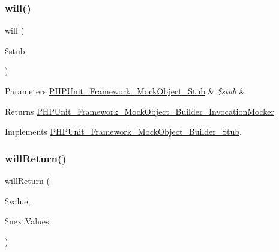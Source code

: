 \subsubsection{\texorpdfstring{will()}{will()}}
{\footnotesize\ttfamily will (\begin{DoxyParamCaption}\item[{\mbox{\hyperlink{interface_p_h_p_unit___framework___mock_object___stub}{P\+H\+P\+Unit\+\_\+\+Framework\+\_\+\+Mock\+Object\+\_\+\+Stub}}}]{\$stub }\end{DoxyParamCaption})}


\begin{DoxyParams}[1]{Parameters}
\mbox{\hyperlink{interface_p_h_p_unit___framework___mock_object___stub}{P\+H\+P\+Unit\+\_\+\+Framework\+\_\+\+Mock\+Object\+\_\+\+Stub}} & {\em \$stub} & \\
\hline
\end{DoxyParams}
\begin{DoxyReturn}{Returns}
\mbox{\hyperlink{class_p_h_p_unit___framework___mock_object___builder___invocation_mocker}{P\+H\+P\+Unit\+\_\+\+Framework\+\_\+\+Mock\+Object\+\_\+\+Builder\+\_\+\+Invocation\+Mocker}} 
\end{DoxyReturn}


Implements \mbox{\hyperlink{interface_p_h_p_unit___framework___mock_object___builder___stub_a0ca62ef89f1b4b06709f6db190ebbf58}{P\+H\+P\+Unit\+\_\+\+Framework\+\_\+\+Mock\+Object\+\_\+\+Builder\+\_\+\+Stub}}.

\mbox{\label{class_p_h_p_unit___framework___mock_object___builder___invocation_mocker_a61f331332fec29cb49a0cccef4f39e7d}} 
\subsubsection{\texorpdfstring{will\+Return()}{willReturn()}}
{\footnotesize\ttfamily will\+Return (\begin{DoxyParamCaption}\item[{}]{\$value,  }\item[{}]{\$next\+Values }\end{DoxyParamCaption})}


